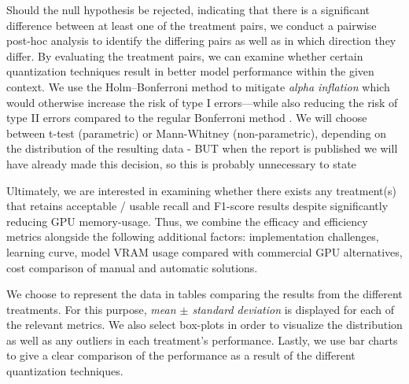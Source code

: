Should the null hypothesis be rejected, indicating that there is a significant difference between at least one of the treatment pairs, we conduct a pairwise post-hoc analysis to identify the differing pairs as well as in which direction they differ. By evaluating the treatment pairs, we can examine whether certain quantization techniques result in better model performance within the given context. 
We use the Holm–Bonferroni method to mitigate \textit{alpha inflation} which would otherwise increase the risk of type I errors---while also reducing the risk of type II errors compared to the regular Bonferroni method \cite{abdi2010HolmBonferroni}.
We will choose between t-test (parametric) or Mann-Whitney (non-parametric), depending on the distribution of the resulting data - BUT when the report is published we will have already made this decision, so this is probably unnecessary to state

Ultimately, we are interested in examining whether there exists any treatment(s) that retains acceptable / usable recall and F1-score results despite significantly reducing GPU memory-usage. Thus, we combine the efficacy and efficiency metrics alongside the following additional factors: implementation challenges, learning curve, model VRAM usage compared with commercial GPU alternatives, cost comparison of manual and automatic solutions. 

We choose to represent the data in tables comparing the results from the different treatments. For this purpose, \textit{mean $\pm$ standard deviation} is displayed for each of the relevant metrics. We also select box-plots in order to visualize the distribution as well as any outliers in each treatment's performance. Lastly, we use bar charts to give a clear comparison of the performance as a result of the different quantization techniques.
